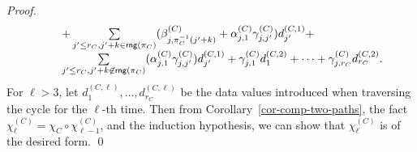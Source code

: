 \documentclass[runningheads,a4paper]{llncs}
\newcommand\rng{\mathsf{rng}}
\begin{document}
\begin{appendix}
\begin{proof}
\[\begin{array}{l c l}
%
& & + \sum \limits_{j' \le r_C, j' + k \in \rng(\pi_C)} (\beta^{(C)}_{j,\pi_C^{-1}(j'+k)}+\alpha^{(C)}_{j,1} \gamma^{(C)}_{j,j'}) d^{(C,1)}_{j'} +\\
%
& & \sum \limits_{j' \le r_C, j' + k \not \in \rng(\pi_C)} (\alpha^{(C)}_{j,1} \gamma^{(C)}_{j,j'}) d^{(C,1)}_{j'} + 
 \gamma^{(C)}_{j,1} d^{(C,2)}_1 +\dots + \gamma^{(C)}_{j,r_C} d^{(C,2)}_{r_C}.
\end{array}
\] 
For $\ell > 3$, let $d^{(C,\ell)}_{1},\dots,d^{(C,\ell)}_{r_C}$ be the data values introduced when traversing the cycle for the $\ell$-th time. Then from Corollary~\ref{cor-comp-two-paths}, the fact $\chi^{(C)}_\ell = \chi_C \circ \chi^{(C)}_{\ell-1}$, and the induction hypothesis, we can show that $\chi^{(C)}_\ell$ is of the desired form.
\qed
\end{proof}


\end{appendix}
\end{document}
